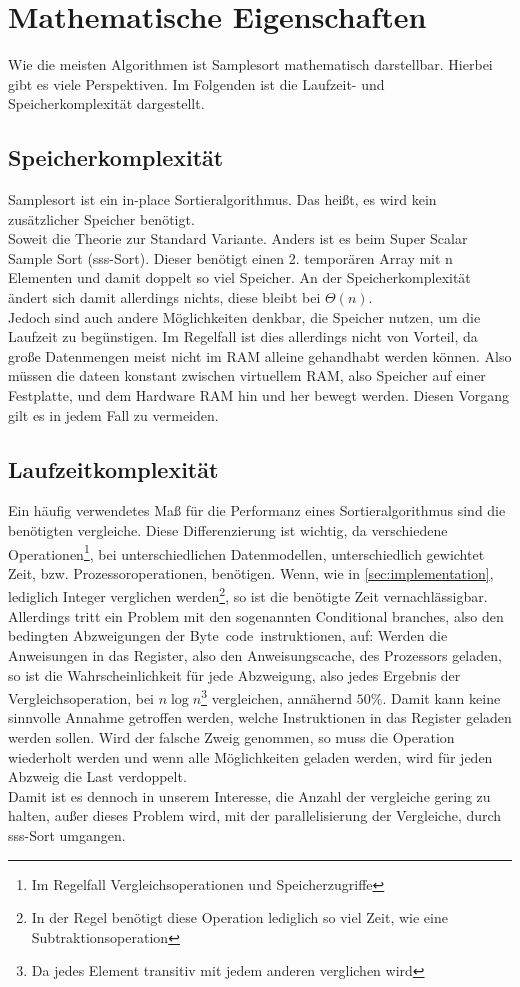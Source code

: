 \section{Mathematische Eigenschaften}
	Wie die meisten Algorithmen ist Samplesort mathematisch darstellbar.
	Hierbei gibt es viele Perspektiven.
	Im Folgenden ist die Laufzeit- und Speicherkomplexität dargestellt.
	
	\subsection{Speicherkomplexität}
		Samplesort ist ein in-place Sortieralgorithmus.
		Das heißt, es wird kein zusätzlicher Speicher benötigt.\\
		Soweit die Theorie zur Standard Variante.
		Anders ist es beim Super Scalar Sample Sort (sss-Sort). \autocite{sanders-2004} 
		Dieser benötigt einen 2. temporären Array mit n Elementen und damit doppelt so viel Speicher.
		An der Speicherkomplexität ändert sich damit allerdings nichts, diese bleibt bei $\Theta(n)$.\\
		Jedoch sind auch andere Möglichkeiten denkbar, die Speicher nutzen, um die Laufzeit zu begünstigen.
		Im Regelfall ist dies allerdings nicht von Vorteil, da große Datenmengen meist nicht im RAM alleine gehandhabt werden können.
		Also müssen die dateen konstant zwischen virtuellem RAM, also Speicher auf einer Festplatte, und dem Hardware RAM hin und her bewegt werden.
		Diesen Vorgang gilt es in jedem Fall zu vermeiden.

	\subsection{Laufzeitkomplexität}
		Ein häufig verwendetes Maß für die Performanz eines Sortieralgorithmus sind die benötigten vergleiche.
		Diese Differenzierung ist wichtig, da verschiedene Operationen\footnote{Im Regelfall Vergleichsoperationen und Speicherzugriffe}, bei unterschiedlichen Datenmodellen, unterschiedlich gewichtet Zeit, bzw. Prozessoroperationen, benötigen.
		Wenn, wie in \ref{sec:implementation}, lediglich Integer verglichen werden\footnote{In der Regel benötigt diese Operation lediglich so viel Zeit, wie eine Subtraktionsoperation}, so ist die benötigte Zeit vernachlässigbar.
		Allerdings tritt ein Problem mit den sogenannten Conditional branches, also den bedingten Abzweigungen der Byte~code~instruktionen, auf:
		Werden die Anweisungen in das Register, also den Anweisungscache, des Prozessors geladen, so ist die Wahrscheinlichkeit für jede Abzweigung, also jedes Ergebnis der Vergleichsoperation, bei $n\log{n}$\footnote{Da jedes Element transitiv mit jedem anderen verglichen wird} vergleichen, annähernd $50\%$.
		Damit kann keine sinnvolle Annahme getroffen werden, welche Instruktionen in das Register geladen werden sollen.
		Wird der falsche Zweig genommen, so muss die Operation wiederholt werden und wenn alle Möglichkeiten geladen werden, wird für jeden Abzweig die Last verdoppelt. \autocite{sanders-2004}\\
		Damit ist es dennoch in unserem Interesse, die Anzahl der vergleiche gering zu halten, außer dieses Problem wird, mit der parallelisierung der Vergleiche, durch sss-Sort umgangen.
		
